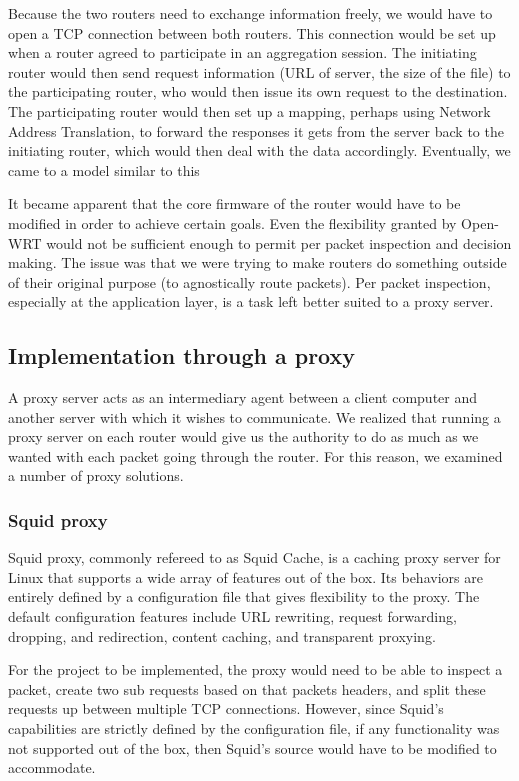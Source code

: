 \documentclass[12pt]{article}
\begin{document}
		Because the two routers need to exchange information freely, we would have to open a TCP connection between both routers. This connection would be set up when a router agreed to participate in an aggregation session. The initiating router would then send request information (URL of server, the size of the file) to the participating router, who would then issue its own request to the destination. The participating router would then set up a mapping, perhaps using Network Address Translation, to forward the responses it gets from the server back to the initiating router, which would then deal with the data accordingly. Eventually, we came to a model similar to this

		It became apparent that the core firmware of the router would have to be modified in order to achieve certain goals. Even the flexibility granted by Open-WRT would not be sufficient enough to permit per packet inspection and decision making. The issue was that we were trying to make routers do something outside of their original purpose (to agnostically route packets). Per packet inspection, especially at the application layer, is a task left better suited to a proxy server.



	\subsection{Implementation through a proxy}

		A proxy server acts as an intermediary agent between a client computer and another server with which it wishes to communicate. We realized that running a proxy server on each router would give us the authority to do as much as we wanted with each packet going through the router. For this reason, we examined a number of proxy solutions. 

		\subsubsection{Squid proxy}

			Squid proxy, commonly refereed to as Squid Cache, is a caching proxy server for Linux that supports a wide array of features out of the box. Its behaviors are entirely defined by a configuration file that gives flexibility to the proxy. The default configuration features include URL rewriting, request forwarding, dropping, and redirection, content caching, and transparent proxying.

			For the project to be implemented, the proxy would need to be able to inspect a packet, create two sub requests based on that packets headers, and split these requests up between multiple TCP connections. However, since Squid's capabilities are strictly defined by the configuration file, if any functionality was not supported out of the box, then Squid's source would have to be modified to accommodate.
\end{document}
